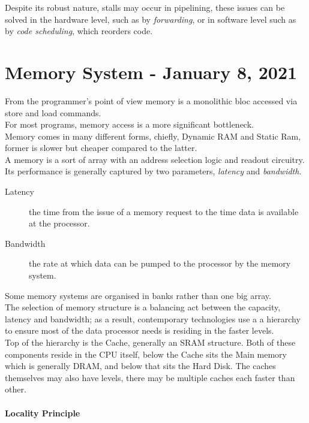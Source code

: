 \documentclass[11pt,a4paper,twocolumn]{book}
\begin{document}
Despite its robust nature, stalls may occur in pipelining, these issues can be solved in the hardware level, such as by \textit{forwarding}, or in software level such as by \textit{code scheduling}, which reorders code.

\chapter{Memory System - January 8, 2021}

From the programmer's point of view memory  is a monolithic bloc accessed via store and load commands.\\

For most programs, memory access is a more significant bottleneck.\\

Memory comes in many different forms, chiefly, Dynamic RAM and Static Ram, former is slower but cheaper compared to the latter.\\

A memory is a sort of array with an address selection logic and readout circuitry. Its performance is generally captured by two parameters, \textit{latency} and \textit{bandwidth}.

\begin{description}
\item[Latency] the time from the issue of a memory request to the time data is available at the processor.
\item[Bandwidth] the rate at which data can be pumped to the processor by the memory system.
\end{description}

Some memory systems are organised in banks rather than one big array.\\

The selection of memory structure is a balancing act between the capacity, latency and bandwidth; as a result, contemporary technologies use a a hierarchy to ensure most of the data processor needs is residing in the faster levels.\\

Top of the hierarchy is the Cache, generally an SRAM structure. Both of these components reside in the CPU itself, below the Cache sits the Main memory which is generally DRAM, and below that sits the Hard Disk. The caches themselves may also have levels, there may be multiple caches each faster than other.

\subsubsection{Locality Principle}
\end{document}
